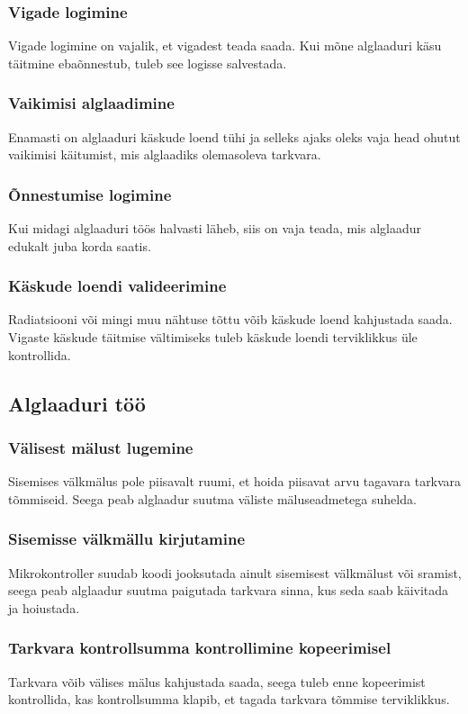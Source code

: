 \documentclass[12pt,a4paper]{article}
\begin{document}
\subsubsection{Vigade logimine}
Vigade logimine on vajalik, et vigadest teada saada. Kui mõne alglaaduri käsu
täitmine ebaõnnestub, tuleb see logisse salvestada.

\subsubsection{Vaikimisi alglaadimine}
Enamasti on alglaaduri käskude loend tühi ja selleks ajaks oleks vaja head
ohutut vaikimisi käitumist, mis alglaadiks olemasoleva tarkvara.

\subsubsection{Õnnestumise logimine}
Kui midagi alglaaduri töös halvasti läheb, siis on vaja teada, mis alglaadur
edukalt juba korda saatis.

\subsubsection{Käskude loendi valideerimine}
Radiatsiooni või mingi muu nähtuse tõttu võib käskude loend kahjustada saada.
Vigaste käskude täitmise vältimiseks tuleb käskude loendi terviklikkus üle
kontrollida.

\subsection{Alglaaduri töö}
\subsubsection{Välisest mälust lugemine}
Sisemises välkmälus pole piisavalt ruumi, et hoida piisavat arvu tagavara
tarkvara tõmmiseid. Seega peab alglaadur suutma väliste mäluseadmetega suhelda.

\subsubsection{Sisemisse välkmällu kirjutamine}
Mikrokontroller suudab koodi jooksutada ainult sisemisest välkmälust või
\gls{sram}ist, seega peab alglaadur suutma paigutada tarkvara sinna, kus seda saab
käivitada ja hoiustada.

\subsubsection{Tarkvara kontrollsumma kontrollimine kopeerimisel}
Tarkvara võib välises mälus kahjustada saada, seega tuleb enne kopeerimist
kontrollida, kas kontrollsumma klapib, et tagada tarkvara tõmmise terviklikkus.
\end{document}
